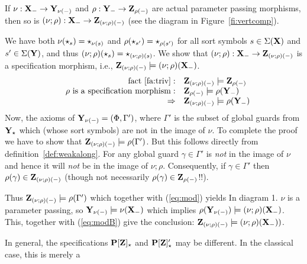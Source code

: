 %
\begin{proposition}\label{prop:vertcomp}
If 
$\nu:{\bf X}_-\to {\bf Y}_{\nu(-)}$ and $\rho:{\bf Y}_-\to {\bf Z}_{\rho(-)}$
 are actual parameter passing
morphisms, then so is $(\nu;\rho):{\bf X}_- \to {\bf Z}_{(\nu;\rho)(-)}$
(see the diagram in Figure~\ref{fi:vertcomp}). 
\end{proposition}
\begin{PROOF}
We have both $\nu(\star_s)=\star_{\nu(s)}$ and
$\rho(\star_{s'})=\star_{\rho(s')}$ for all sort symbols $s\in\Sigma({\bf X})$
and $s'\in\Sigma({\bf Y})$, and thus
$(\nu;\rho)(\star_s)=\star_{(\nu;\rho)(s)}$. We show that
$(\nu;\rho):{\bf X}_- \to {\bf Z}_{(\nu;\rho)(-)}$ is
a specification morphism, i.e., ${\bf Z}_{(\nu;\rho)(-)} \models
(\nu;\rho)({\bf X}_-)$.
\[
\begin{array}{rrl}
&{\rm fact\ \ref{fa:triv}} :& {\bf Z}_{(\nu;\rho)(-)}\models {\bf Z}_{\rho(-)} \nonumber \\
&\rho\ {\rm is\ a\ specification\ morphism} :& {\bf Z}_{\rho(-)}\models\rho({\bf Y}_-) \nonumber \\
& \Rightarrow & {\bf Z}_{(\nu;\rho)(-)}\models\rho({\bf Y}_-) \label{eq:mod}
\end{array}
\]
Now, the axioms of ${\bf Y}_{\nu(-)} =  (\Phi,\Gamma')$, where $\Gamma'$
is the subset of global guards from ${\bf Y}_\star$ which (whose sort symbols)
are not in the image
of $\nu$. To complete the proof we have to show that ${\bf Z}_{(\nu;\rho)(-)}\models \rho(\Gamma')$.
But this follows directly from definition~\ref{def:weakalong}. For any
global guard $\gamma\in\Gamma'$ is {\em not} in the image of $\nu$ and hence
it will {\em not} be in the image of $\nu;\rho$. Consequently, if
$\gamma\in\Gamma'$ then
$\rho(\gamma)\in{\bf Z}_{(\nu;\rho)(-)}$ (though not necessarily 
 $\rho(\gamma)\in {\bf Z}_{\rho(-)}$!!).

Thus ${\bf Z}_{(\nu;\rho)(-)}\models \rho(\Gamma')$ which together with (\ref{eq:mod})
yields
In diagram 1. $\nu$ is a parameter passing, so ${\bf Y}_{\nu(-)}\models \nu({\bf X}_-)$ which implies  
$\rho({\bf Y}_{\nu(-)})\models (\nu;\rho)({\bf X}_-)$.
This, together with (\ref{eq:modB}) give the conclusion: 
${\bf Z}_{(\nu;\rho)(-)}\models (\nu;\rho)({\bf X}_{-}))$.
\end{PROOF}
%
In general, the specifications ${\bf P[Z]_\star}$ and
${\bf P[Z]'_\star}$ may be different. In the classical case, this is merely a
